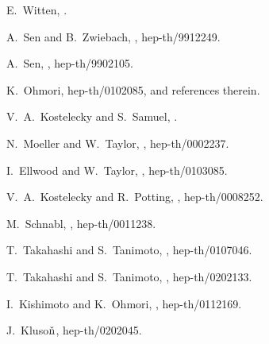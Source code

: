 \documentclass[a4paper,seceq,preprint]{ptptex}
\begin{document}
\begin{thebibliography}{99}
E.~Witten,
.

A.~Sen and B.~Zwiebach,
, hep-th/9912249.

A.~Sen,
, hep-th/9902105.

K.~Ohmori,
hep-th/0102085,
and references therein.

V.~A.~Kostelecky and S.~Samuel,
.

N.~Moeller and W.~Taylor,
, hep-th/0002237.

I.~Ellwood and W.~Taylor,
, hep-th/0103085.

V.~A.~Kostelecky and R.~Potting,
, hep-th/0008252.

M.~Schnabl,
, hep-th/0011238.

T.~Takahashi and S.~Tanimoto,
, hep-th/0107046.

T.~Takahashi and S.~Tanimoto,
, hep-th/0202133.

I.~Kishimoto and K.~Ohmori,
, hep-th/0112169.

J.~Kluso$\check{\rm n}$,
hep-th/0202045.


\end{thebibliography}
\end{document}
